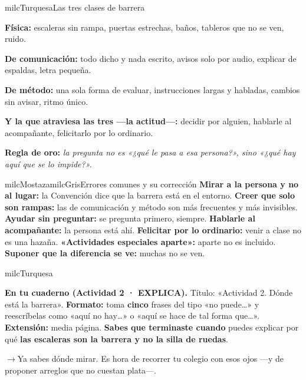 \documentclass[11pt,letterpaper]{article}
\newcommand{\puente}[1]{%
  \begin{puentebox}%
    \textcolor{milcGradeDark}{$\rightarrow$}\hspace{2mm}#1%
  \end{puentebox}%
}
\begin{document}
\begin{drawbox}{milcTurquesa}{Las tres clases de barrera}
\begin{pasoslista}
\item \textbf{Física:} escaleras sin rampa, puertas estrechas, baños, tableros que no se ven, ruido.
\item \textbf{De comunicación:} todo dicho y nada escrito, avisos solo por audio, explicar de espaldas, letra pequeña.
\item \textbf{De método:} una sola forma de evaluar, instrucciones largas y habladas, cambios sin avisar, ritmo único.
\item \textbf{Y la que atraviesa las tres ---la actitud---:} decidir por alguien, hablarle al acompañante, felicitarlo por lo ordinario.
\item \textbf{Regla de oro:} \emph{la pregunta no es «¿qué le pasa a esa persona?», sino «¿qué hay aquí que se lo impide?».}
\end{pasoslista}
\end{drawbox}

\begin{softbox}{milcMostaza}{milcGris}{Errores comunes y su corrección}
\textbf{Mirar a la persona y no al lugar:} la Convención dice que la barrera está en el entorno. \textbf{Creer que solo son rampas:} las de comunicación y método son más frecuentes y más invisibles. \textbf{Ayudar sin preguntar:} se pregunta primero, siempre. \textbf{Hablarle al acompañante:} la persona está ahí. \textbf{Felicitar por lo ordinario:} venir a clase no es una hazaña. \textbf{«Actividades especiales aparte»:} aparte no es incluido. \textbf{Suponer que la diferencia se ve:} muchas no se ven.
\end{softbox}

\begin{infoband}{milcTurquesa}


\textbf{En tu cuaderno (Actividad 2 · EXPLICA).} Título: «Actividad 2. Dónde está la barrera». \textbf{Formato:} toma \textbf{cinco} frases del tipo «no puede\ldots» y reescríbelas como «aquí no hay\ldots» o «aquí se hace de tal forma que\ldots». \textbf{Extensión:} media página. \textbf{Sabes que terminaste cuando} puedes explicar por qué \textbf{las escaleras son la barrera y no la silla de ruedas}.
\end{infoband}

\puente{Ya sabes dónde mirar. Es hora de recorrer tu colegio con esos ojos ---y de proponer arreglos que no cuestan plata---.}
\end{document}
